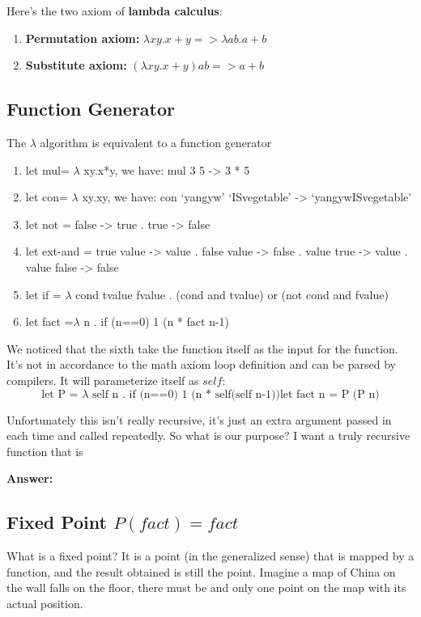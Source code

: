 \documentclass[a4paper]{article}
\theoremstyle{definition}
\begin{document}
Here's the two axiom of \textbf{lambda calculus}:
\begin{enumerate}
\item \textbf{Permutation axiom:} $\lambda xy.x+y=> \lambda ab.a+b$
\item \textbf{Substitute axiom:} $(\lambda xy.x+y)ab=>a+b$
\end{enumerate}

\subsection{Function Generator}

The $\lambda$ algorithm is equivalent to a function generator
\begin{enumerate}
    \item let mul= $\lambda$ xy.x*y, we have: mul 3 5 -> 3 * 5
    \item let con= $\lambda$ xy.xy, we have: con ‘yangyw’ ‘ISvegetable’ -> ‘yangywISvegetable’
    \item let not = false -> true . true -> false
    \item let ext-and = true value -> value . false value -> false . value true -> value . value false -> false
    \item let if = $\lambda$ cond tvalue fvalue . (cond and tvalue) or (not cond and fvalue)
    \item let fact =$\lambda$ n . if (n==0) 1 (n * fact n-1)
\end{enumerate}
We noticed that the sixth take the function itself as the input for the function. It's not in accordance to the math axiom loop definition and can be parsed by compilers. It will parameterize itself as $self$:
$$\text{let P = } \lambda\text{ self n . if (n==0) 1 (n * self(self n-1))$$
$$let fact n = P (P n)}$$


Unfortunately this isn't really recursive, it's just an extra argument passed in each time and called repeatedly. So what is our purpose? I want a truly recursive function that is

\textbf{Answer:}


\subsection{Fixed Point ${P(fact) = fact}$}
What is a fixed point? It is a point (in the generalized sense) that is mapped by a function, and the result obtained is still the point. Imagine a map of China on the wall falls on the floor, there must be and only one point on the map with its actual position.
\end{document}
